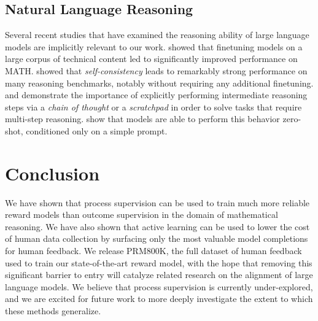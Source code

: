 \subsection{Natural Language Reasoning}

Several recent studies that have examined the reasoning ability of large language models are implicitly relevant to our work. \cite{lewkowycz2022solving} showed that finetuning models on a large corpus of technical content led to significantly improved performance on MATH. \cite{wang2022self} showed that \textit{self-consistency} leads to remarkably strong performance on many reasoning benchmarks, notably without requiring any additional finetuning. \cite{wei2022chain} and \cite{nye2021show} demonstrate the importance of explicitly performing intermediate reasoning steps via a \textit{chain of thought} or a \textit{scratchpad} in order to solve tasks that require multi-step reasoning. \cite{kojima2022large} show that models are able to perform this behavior zero-shot, conditioned only on a simple prompt.

\section{Conclusion}

We have shown that process supervision can be used to train much more reliable reward models than outcome supervision in the domain of mathematical reasoning. We have also shown that active learning can be used to lower the cost of human data collection by surfacing only the most valuable model completions for human feedback. We release PRM800K, the full dataset of human feedback used to train our state-of-the-art reward model, with the hope that removing this significant barrier to entry will catalyze related research on the alignment of large language models. We believe that process supervision is currently under-explored, and we are excited for future work to more deeply investigate the extent to which these methods generalize.


